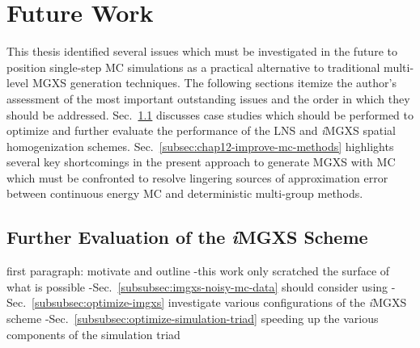 \section{Future Work}
\label{sec:chap12-future-work}

This thesis identified several issues which must be investigated in the future to position single-step \ac{MC} simulations as a practical alternative to traditional multi-level \ac{MGXS} generation techniques. The following sections itemize the author's assessment of the most important outstanding issues and the order in which they should be addressed. Sec.~\ref{subsec:chap12-further-imgxs} discusses case studies which should be performed to optimize and further evaluate the performance of the \ac{LNS} and \textit{i}\ac{MGXS} spatial homogenization schemes. Sec.~\ref{subsec:chap12-improve-mc-methods} highlights several key shortcomings in the present approach to generate \ac{MGXS} with \ac{MC} which must be confronted to resolve lingering sources of approximation error between continuous energy \ac{MC} and deterministic multi-group methods.

\subsection{Further Evaluation of the \textit{i}MGXS Scheme}
\label{subsec:chap12-further-imgxs}



first paragraph: motivate and outline
-this work only scratched the surface of what is possible
-Sec.~\ref{subsubsec:imgxs-noisy-mc-data} should consider using 
-Sec.~\ref{subsubsec:optimize-imgxs} investigate various configurations of the \textit{i}MGXS scheme
-Sec.~\ref{subsubsec:optimize-simulation-triad} speeding up the various components of the simulation triad

